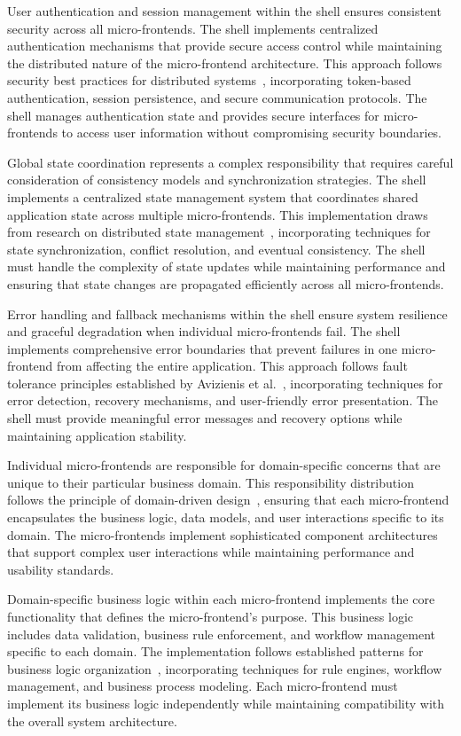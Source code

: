 \documentclass[12pt,a4paper]{report}
\begin{document}
User authentication and session management within the shell ensures consistent security across all micro-frontends. The shell implements centralized authentication mechanisms that provide secure access control while maintaining the distributed nature of the micro-frontend architecture. This approach follows security best practices for distributed systems~\cite{owasp2021authentication}, incorporating token-based authentication, session persistence, and secure communication protocols. The shell manages authentication state and provides secure interfaces for micro-frontends to access user information without compromising security boundaries.

Global state coordination represents a complex responsibility that requires careful consideration of consistency models and synchronization strategies. The shell implements a centralized state management system that coordinates shared application state across multiple micro-frontends. This implementation draws from research on distributed state management~\cite{lamport1978time}, incorporating techniques for state synchronization, conflict resolution, and eventual consistency. The shell must handle the complexity of state updates while maintaining performance and ensuring that state changes are propagated efficiently across all micro-frontends.

Error handling and fallback mechanisms within the shell ensure system resilience and graceful degradation when individual micro-frontends fail. The shell implements comprehensive error boundaries that prevent failures in one micro-frontend from affecting the entire application. This approach follows fault tolerance principles established by Avizienis et al.~\cite{avizienis2004basic}, incorporating techniques for error detection, recovery mechanisms, and user-friendly error presentation. The shell must provide meaningful error messages and recovery options while maintaining application stability.

Individual micro-frontends are responsible for domain-specific concerns that are unique to their particular business domain. This responsibility distribution follows the principle of domain-driven design~\cite{evans2003domain}, ensuring that each micro-frontend encapsulates the business logic, data models, and user interactions specific to its domain. The micro-frontends implement sophisticated component architectures that support complex user interactions while maintaining performance and usability standards.

Domain-specific business logic within each micro-frontend implements the core functionality that defines the micro-frontend's purpose. This business logic includes data validation, business rule enforcement, and workflow management specific to each domain. The implementation follows established patterns for business logic organization~\cite{fowler2018refactoring}, incorporating techniques for rule engines, workflow management, and business process modeling. Each micro-frontend must implement its business logic independently while maintaining compatibility with the overall system architecture.
\end{document}
